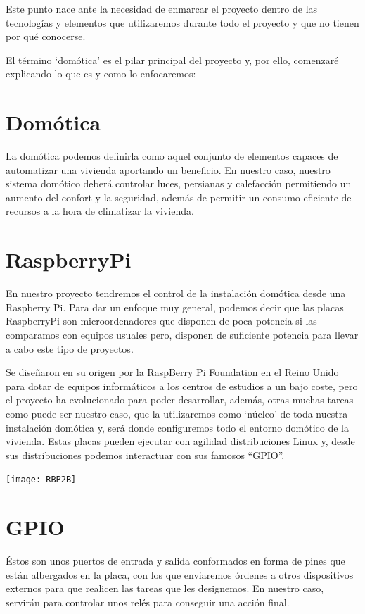 
Este punto nace ante la necesidad de enmarcar el proyecto dentro de las tecnologías y elementos que utilizaremos durante todo el proyecto y que no tienen por qué conocerse.

El término ‘domótica’ es el pilar principal del proyecto y, por ello, comenzaré explicando lo que es y como lo enfocaremos:

\section{Domótica}
La domótica podemos definirla como aquel conjunto de elementos capaces de automatizar una vivienda aportando un beneficio.
En nuestro caso, nuestro sistema domótico deberá controlar luces, persianas y calefacción permitiendo un aumento del confort y la seguridad, además de permitir un consumo eficiente de recursos a la hora de climatizar la vivienda.

\section{RaspberryPi}
En nuestro proyecto tendremos el control de la instalación domótica desde una Raspberry Pi. 
Para dar un enfoque muy general, podemos decir que las placas RaspberryPi son microordenadores que disponen de poca potencia si las comparamos con equipos usuales pero, disponen de suficiente potencia para llevar a cabo este tipo de proyectos.

Se diseñaron en su origen por la RaspBerry Pi Foundation en el Reino Unido para dotar de equipos informáticos a los centros de estudios a un bajo coste, pero el proyecto ha evolucionado para poder desarrollar, además, otras muchas tareas como puede ser nuestro caso, que la utilizaremos como ‘núcleo’ de toda nuestra instalación domótica y, será donde configuremos todo el entorno domótico de la vivienda.
Estas placas pueden ejecutar con agilidad distribuciones Linux y, desde sus distribuciones podemos interactuar con sus famosos “GPIO”.
  \begin{center}
  \texttt{[image: RBP2B]}
  \end{center}

\section{GPIO}
Éstos son unos puertos de entrada y salida conformados en forma de pines que están albergados en la placa, con los que enviaremos órdenes a otros dispositivos externos para que realicen las tareas que les designemos. En nuestro caso, servirán para controlar unos relés para conseguir una acción final.


